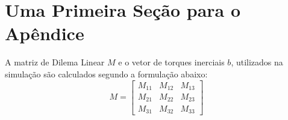 \section{Uma Primeira Seção para o Apêndice}

A matriz de Dilema Linear $M$ e o vetor de torques inerciais $b$,
utilizados na simulação são calculados segundo a formulação 
abaixo:
\begin{equation}
M=\left[ \begin{array}{ccc}
M_{11} & M_{12} & M_{13} \\
M_{21} & M_{22} & M_{23} \\
M_{31} & M_{32} & M_{33}
\end{array} \right]
\end{equation}
